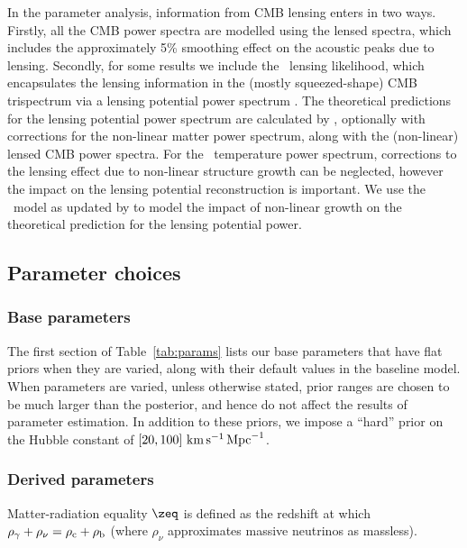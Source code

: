 In the parameter analysis, information from CMB lensing enters in two
ways. Firstly, all the CMB power spectra are modelled using the lensed
spectra, which includes the approximately 5\% smoothing effect on
the acoustic peaks due to lensing. Secondly, for some results we
include the \planck\ lensing likelihood, which encapsulates the
lensing information in the (mostly squeezed-shape) CMB trispectrum via
a lensing potential power spectrum \citep{planck2013-p12}.
The theoretical predictions for the lensing potential power spectrum are
calculated by \CAMB, optionally with corrections for the non-linear matter power spectrum, along with the (non-linear) lensed
CMB power spectra. For the \planck\ temperature power spectrum, corrections
to the lensing effect due to non-linear structure growth can be neglected,
however the impact on the lensing potential reconstruction is important.
We use the \HALOFIT\ model \citep{Smith:2002dz} as updated by
\cite{Takahashi:2012em} to model the impact of non-linear growth on the
theoretical prediction for the lensing potential power.

\subsection{Parameter choices}

\subsubsection{Base parameters}

The first section of Table~\ref{tab:params}
lists our base parameters that have flat priors
when they are varied, along with their default values in the baseline model.
When parameters are varied, unless otherwise stated, prior ranges are
chosen to be much larger than the posterior, and hence do not affect
the results of parameter estimation. In addition to these priors,
we impose a ``hard'' prior on the Hubble constant of $[20, 100]
\ {\rm km}\, {\rm s}^{-1}\, {\rm Mpc}^{-1}$.

\subsubsection{Derived parameters}

Matter-radiation equality $\zeq$ is defined as the redshift at
which $\rho_\gamma+\rho_\nu = \rho_{\rm c}+\rho_{\rm b}$
(where $\rho_\nu$ approximates massive neutrinos as massless).

